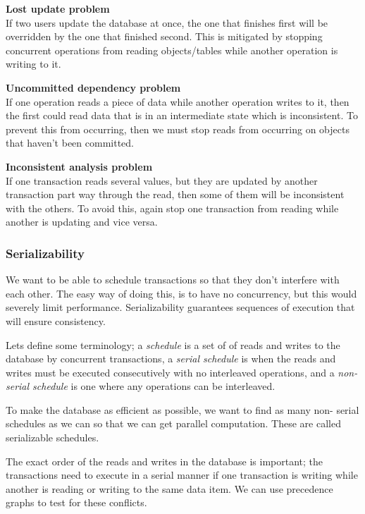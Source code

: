 \begin{description}
  \item \textbf{Lost update problem}\\
    If two users update the database at once, the one that finishes first will
    be overridden by the one that finished second. This is mitigated by stopping
    concurrent operations from reading objects/tables while another operation is
    writing to it.
  \item \textbf{Uncommitted dependency problem}\\
    If one operation reads a piece of data while another operation writes to it,
    then the first could read data that is in an intermediate state which is 
    inconsistent. To prevent this from occurring, then we must stop reads from
    occurring on objects that haven't been committed.
  \item \textbf{Inconsistent analysis problem}\\
    If one transaction reads several values, but they are updated by another
    transaction part way through the read, then some of them will be
    inconsistent with the others. To avoid this, again stop one transaction from
    reading while another is updating and vice versa.
\end{description}

\subsubsection{Serializability}

We want to be able to schedule transactions so that they don't interfere with
each other. The easy way of doing this, is to have no concurrency, but this would
severely limit performance. Serializability guarantees sequences of execution
that will ensure consistency.

Lets define some terminology; a \textit{schedule} is a set of of reads and
writes to the database by concurrent transactions, a \textit{serial schedule} is
when the reads and writes must be executed consecutively with no interleaved
operations, and a \textit{non-serial schedule} is one where any operations can
be interleaved.

To make the database as efficient as possible, we want to find as many non-
serial schedules as we can so that we can get parallel computation. These are
called serializable schedules.

The exact order of the reads and writes in the database is important; the
transactions need to execute in a serial manner if one transaction is writing
while another is reading or writing to the same data item. We can use precedence
graphs to test for these conflicts.

